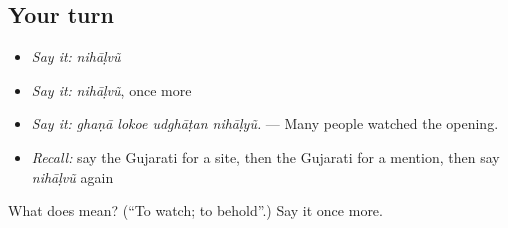 \subsection*{Your turn}
\begin{itemize}
\raggedright
  \item \emph{Say it:} \emph{nihāḷvũ}
  \item \emph{Say it:} \emph{nihāḷvũ}, once more
  \item \emph{Say it:} \emph{ghaṇā lokoe udghāṭan nihāḷyũ.} — Many people watched the opening.
  \item \emph{Recall:} say the Gujarati for a site, then the Gujarati for a mention, then say \emph{nihāḷvũ} again
\end{itemize}

\begin{tcolorbox}[breakable,colback=teal!4,colframe=teal!35!black,title={Before you move on}]
What does  mean? (\textquotedblleft{}To watch; to behold\textquotedblright{}.) Say it once more.
\end{tcolorbox}

